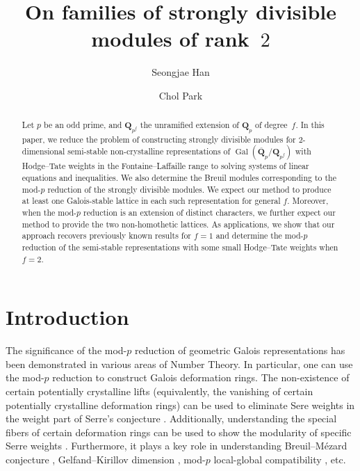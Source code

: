 \documentclass[11pt]{amsart}
\author{Seongjae Han}
\author{Chol Park}
\theoremstyle{definition}
\numberwithin{equation}{subsection}
\theoremstyle{plain}
\theoremstyle{plain}
\theoremstyle{plain}
\theoremstyle{plain}
\theoremstyle{plain}
\theoremstyle{plain}
\theoremstyle{plain}
\theoremstyle{plain}
\theoremstyle{plain}
\theoremstyle{plain}
\theoremstyle{plain}
\theoremstyle{plain}
\theoremstyle{definition}
\theoremstyle{definition}
\theoremstyle{definition}
\theoremstyle{remark}
\renewcommand{\(}{\textup{(}}
\renewcommand{\)}{\textup{)}}
\DeclareMathOperator{\Gal}{Gal}
\newcommand{\Q}{\mathbf{Q}}
\begin{document}
\title{On families of strongly divisible modules of rank~$2$}




\begin{abstract}
Let $p$ be an odd prime, and $\Q_{p^f}$ the unramified extension of $\Q_p$ of degree~$f$. In this paper, we reduce the problem of constructing strongly divisible modules for $2$-dimensional semi-stable non-crystalline representations of $\Gal(\overline{\Q}_p/\Q_{p^f})$ with Hodge--Tate weights in the Fontaine--Laffaille range to solving systems of linear equations and inequalities. We also determine the Breuil modules corresponding to the mod-$p$ reduction of the strongly divisible modules. We expect our method to produce at least one Galois-stable lattice in each such representation for general $f$. Moreover, when the mod-$p$ reduction is an extension of distinct characters, we further expect our method to provide the two non-homothetic lattices. As applications, we show that our approach recovers previously known results for $f=1$ and determine the mod-$p$ reduction of the semi-stable representations with some small Hodge--Tate weights when $f=2$.
\end{abstract}

\maketitle


\tableofcontents



\section{Introduction}
The significance of the mod-$p$ reduction of geometric Galois representations has been demonstrated in various areas of Number Theory. In particular, one can use the mod-$p$ reduction to construct Galois deformation rings. The non-existence of certain potentially crystalline lifts (equivalently, the vanishing of certain potentially crystalline deformation rings) can be used to eliminate Sere weights in the weight part of Serre's conjecture \cite{GLS14,GLS15,MP,LMP,LLL}. Additionally, understanding the special fibers of certain deformation rings can be used to show the modularity of specific Serre weights \cite{LLHLM18,LLL,LLMPQb}. Furthermore, it plays a key role in understanding Breuil--M\'ezard conjecture \cite{BM,Kis09,Pas15,CEGS,EG,GK,LLHLM23}, Gelfand--Kirillov dimension \cite{BHHMS}, mod-$p$ local-global compatibility \cite{PQ,LLMPQa,EL}, etc.
\end{document}
